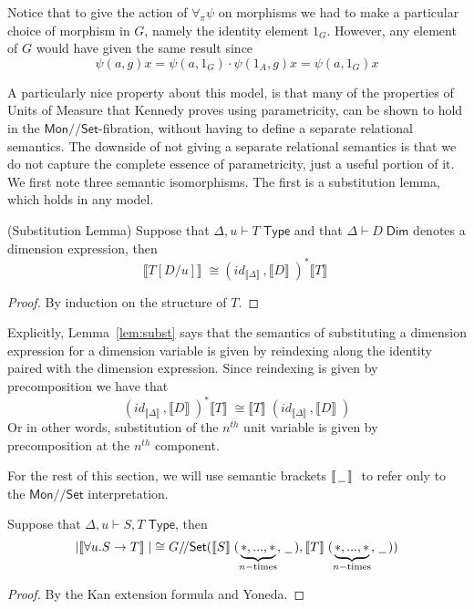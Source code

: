 \documentclass[a4paper,UKenglish]{lipics}
\newcommand{\UoM}{Units of Measure\xspace}
\newcommand{\msf}[1]{\mathsf{#1}} %
\newcommand{\Mon}{\msf{Mon}}
\newcommand{\Set}{\msf{Set}}
\newcommand{\blank}{\, \underline{\hspace{2mm}} \,}
\newcommand{\GroupSet}[1]{#1/\!/\Set}
\newcommand{\MonSet}{\GroupSet{\Mon}}
\newcommand{\GSet}{\GroupSet{G}}
\newcommand{\sem}[1]{\ensuremath{\llbracket #1 \rrbracket} \;}
\newcommand{\Dj}[2]{#1 \vdash #2 \; \msf{ Dim}}
\newcommand{\Dim}{D}
\begin{document}
Notice that to give the action of $\forall_\pi \psi$ on morphisms we had to make a particular choice of morphism in $G$, namely the identity element $1_G$. However, any element of $G$ would have given the same result since
\[
  \psi (a, g) x = \psi (a, 1_G) \cdot \psi (1_A, g) x = \psi (a, 1_G) x
\]

A particularly nice property about this model, is that many of the properties of \UoM that Kennedy proves using parametricity, can be shown to hold in the $\MonSet$-fibration, without having to define a separate relational semantics. The downside of not giving a separate relational semantics is that we do not capture the complete essence of parametricity, just a useful portion of it. We first note three semantic isomorphisms. The first is a substitution lemma, which holds in any model.

\begin{lemma}(Substitution Lemma)
\label{lem:subst}
Suppose that $\Delta, u \vdash T \; \msf{ Type}$ and that $\Dj\Delta \Dim$ denotes a dimension expression, then
\[
 \sem{T[D/u]} \cong (id_{\sem{\Delta}} , \sem{D})^\ast \sem{T}
\]
\end{lemma}
\begin{proof}
 By induction on the structure of $T$.
\end{proof}


Explicitly, Lemma~\ref{lem:subst} says that the semantics of substituting a dimension expression for a dimension variable is given by reindexing along the identity paired with the dimension expression. Since reindexing is given by precomposition we have that
\[
 (id_{\sem{\Delta}} , \sem{D})^\ast \sem{T} \cong \sem{T}(id_{\sem{\Delta}}, \sem{D})
\]
Or in other words, substitution of the $n^{th}$ unit variable is given by precomposition at the $n^{th}$ component.

For the rest of this section, we will use semantic brackets $\sem{\, \underline{\hspace{2mm}}\, }$ to refer only to the $\MonSet$ interpretation.

\begin{lemma}
\label{lemma:allarrows}
 Suppose that $\Delta, u \vdash S,T \; \msf{ Type}$, then
\[
|\sem{\forall u. S \rightarrow T}| \cong \GSet (\sem{S}(\underbrace{\ast,...,\ast}_{n-\text{times}}, \blank),\sem{T}(\underbrace{\ast,...,\ast}_{n-\text{times}}, \blank))
\]
\end{lemma}
\begin{proof}
By the Kan extension formula and Yoneda.
\end{proof}
\end{document}
